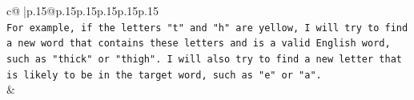 \documentclass{article}
\begin{document}
{\begin{supertabular}{c@{$\;$}|p{.15\linewidth}@{}p{.15\linewidth}p{.15\linewidth}p{.15\linewidth}p{.15\linewidth}p{.15\linewidth}}
{{{\\ 
\texttt{For example, if the letters "t" and "h" are yellow, I will try to find a new word that contains these letters and is a valid English word, such as "thick" or "thigh". I will also try to find a new letter that is likely to be in the target word, such as "e" or "a".} \\
            }
        }
    }
    & \\ \\

\end{supertabular}
}
\end{document}
